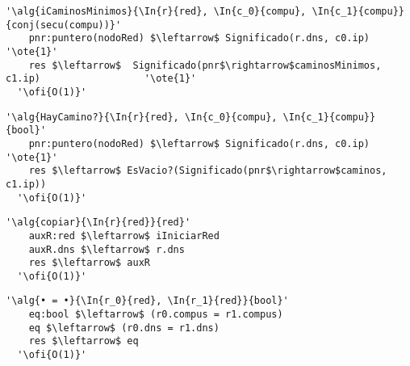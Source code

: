\begin{lstlisting}[mathescape]
  '\alg{iCaminosMinimos}{\In{r}{red}, \In{c_0}{compu}, \In{c_1}{compu}}{conj(secu(compu))}'
    pnr:puntero(nodoRed) $\leftarrow$ Significado(r.dns, c0.ip)                           '\ote{1}'
    res $\leftarrow$  Significado(pnr$\rightarrow$caminosMinimos, c1.ip)                  '\ote{1}'
  '\ofi{O(1)}'
\end{lstlisting}

\begin{lstlisting}[mathescape]
  '\alg{HayCamino?}{\In{r}{red}, \In{c_0}{compu}, \In{c_1}{compu}}{bool}'
    pnr:puntero(nodoRed) $\leftarrow$ Significado(r.dns, c0.ip)                            '\ote{1}'
    res $\leftarrow$ EsVacio?(Significado(pnr$\rightarrow$caminos, c1.ip))                                       
  '\ofi{O(1)}'
\end{lstlisting}

\begin{lstlisting}[mathescape]
  '\alg{copiar}{\In{r}{red}}{red}'
    auxR:red $\leftarrow$ iIniciarRed
    auxR.dns $\leftarrow$ r.dns
    res $\leftarrow$ auxR                                
  '\ofi{O(1)}'
\end{lstlisting}

\begin{lstlisting}[mathescape]
  '\alg{• = •}{\In{r_0}{red}, \In{r_1}{red}}{bool}'
    eq:bool $\leftarrow$ (r0.compus = r1.compus)
    eq $\leftarrow$ (r0.dns = r1.dns)
    res $\leftarrow$ eq                               
  '\ofi{O(1)}'
\end{lstlisting}


 
